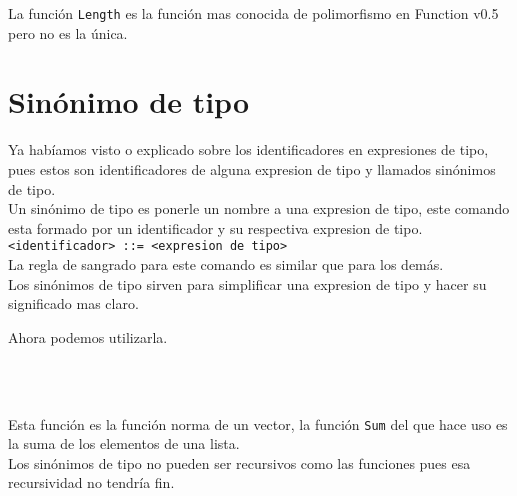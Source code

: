       La función \texttt{Length} es la función mas conocida de polimorfismo en Function v0.5 pero no es la única.
      
   \section{Sinónimo de tipo}
      Ya habíamos visto o explicado sobre los identificadores en expresiones de tipo, pues estos son identificadores de alguna expresion de tipo y llamados sinónimos de tipo.
      \\
      
      Un sinónimo de tipo es ponerle un nombre a una expresion de tipo, este comando esta formado por un identificador y su respectiva expresion de tipo.
      \\
      
      \texttt{<identificador> ::= <expresion de tipo>}
      \\
      
      La regla de sangrado para este comando es similar que para los demás.
      \\
      
      Los sinónimos de tipo sirven para simplificar una expresion de tipo y hacer su significado mas claro.
      
      \begin{fxcode}
          
      \end{fxcode}
      
      Ahora podemos utilizarla.
      
      \begin{fxcode}
         \\
         \\
      \end{fxcode}
      
      Esta función es la función norma de un vector, la función \texttt{Sum} del que hace uso es la suma de los elementos de una lista.
      \\
      
      Los sinónimos de tipo no pueden ser recursivos como las funciones pues esa recursividad no tendría fin.
      
